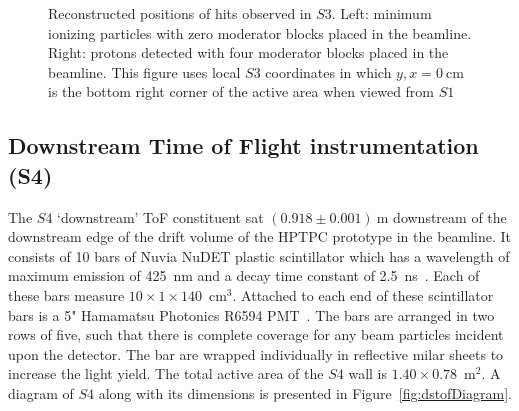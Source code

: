 \begin{figure}[t]
  \begin{minipage}[t]{0.49\textwidth}
    \centering
    \begin{adjustbox}{max totalsize={\textwidth}{.5\textheight},center}
      
    \end{adjustbox}
  \end{minipage} 	
  \hfill
  \begin{minipage}[t]{0.49\textwidth}
    \centering
    \begin{adjustbox}{max totalsize={\textwidth}{.5\textheight},center}
      
    \end{adjustbox}
  \end{minipage}  
   \caption{ \label{fig:s3XY_pion}Reconstructed positions of hits observed in $\mathit{S3}$. Left: minimum ionizing particles with zero moderator blocks placed in the beamline. Right: protons detected with four moderator blocks placed in the beamline. This figure uses local $\mathit{S3}$ coordinates in which $y,x=0~\text{cm}$ is the bottom right corner of the active area when viewed from $\mathit{S1}$}
\end{figure}


\subsection{Downstream Time of Flight instrumentation (S4)}
\label{subsec:s4Exp}
The $\mathit{S4}$ `downstream' ToF constituent sat $(0.918 \pm 0.001)~\text{m}$ downstream of the downstream edge of the drift volume of the HPTPC prototype in the beamline.
It consists of 10 bars of Nuvia NuDET plastic scintillator which has a wavelength of maximum emission of 425~nm and a decay time constant of 2.5~ns~\cite{Nuvia}.
Each of these bars measure $10 \times 1 \times 140$~cm$^3$. 
Attached to each end of these scintillator bars is a 5" Hamamatsu Photonics R6594 PMT~\cite{Hamamatsu}.
The bars are arranged in two rows of five, such that there is complete coverage for any beam particles incident upon the detector.
The bar are wrapped individually in reflective milar sheets to increase the light yield.
The total active area of the $\mathit{S4}$ wall is $1.40 \times 0.78$~m$^2$.
A diagram of $\mathit{S4}$ along with its dimensions is presented in Figure~\ref{fig:dstofDiagram}.

